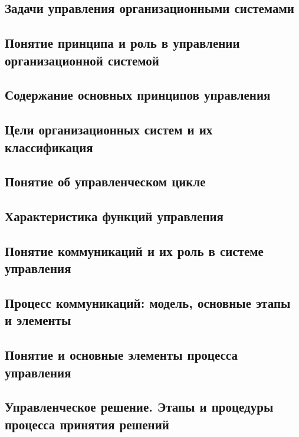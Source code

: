 \documentclass[a4paper,12pt,oneside,final]{extarticle}
\numberwithin{equation}{section}
\begin{document}
\subsection{Задачи управления организационными системами}

\subsection{Понятие принципа и роль в управлении организационной системой}

\subsection{Содержание основных принципов управления}

\subsection{Цели организационных систем и их классификация}

\subsection{Понятие об управленческом цикле}

\subsection{Характеристика функций управления}

\subsection{Понятие коммуникаций и их роль в системе управления}

\subsection{Процесс коммуникаций: модель, основные этапы и элементы}

\subsection{Понятие и основные элементы процесса управления}

\subsection{Управленческое решение. Этапы и процедуры процесса принятия решений}
\end{document}
